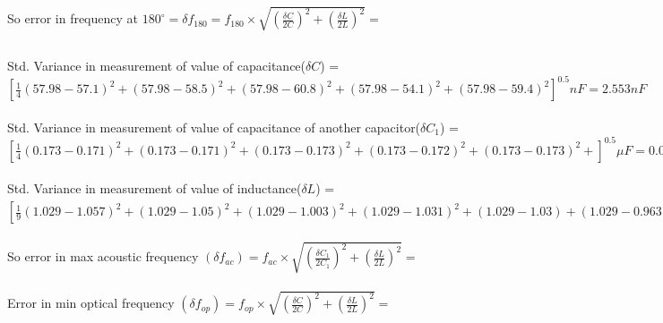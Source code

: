 So error in frequency at $180^{\circ} =\delta f_{180} =f_{180}\times \sqrt{\left( \frac{\delta C}{2C}\right)^2+\left(\frac{\delta L}{2L}\right)^2}=$
\subsection{\up{\d}}
Std. Variance in measurement of value of capacitance($\delta C$) = $[\frac{1}{4}(57.98-57.1)^2+(57.98-58.5)^2+ (57.98-60.8)^2+(57.98-54.1)^2+(57.98-59.4)^2]^{0.5}nF=2.553nF$\\ \\
Std. Variance in measurement of value of capacitance of another capacitor($\delta C_1$) = $[\frac{1}{4}(0.173-0.171)^2+(0.173-0.171)^2+(0.173-0.173)^2+ (0.173-0.172)^2+(0.173-0.173)^2+]^{0.5}\mu F=0.003\mu F$\\ \\
Std. Variance in measurement of value of inductance($\delta L$) = $[\frac{1}{9}(1.029-1.057)^2+(1.029-1.05)^2+(1.029-1.003)^2+(1.029-1.031)^2+(1.029-1.03)+(1.029-0.963)^2+(1.029-0.996)^2+(1.029-1.041)^2+(1.029-1.06)^2+(1.029-1.063)^2]^{0.5}mH=0.003mH$\\ \\
So error in max acoustic frequency  $(\delta f_{ac})=f_{ac}\times \sqrt{\left( \frac{\delta C_1}{2C_1}\right)^2+\left(\frac{\delta L}{2L}\right)^2}=$ \\ \\
Error in min optical frequency  $(\delta f_{op})=f_{op}\times \sqrt{\left( \frac{\delta C}{2C}\right)^2+\left(\frac{\delta L}{2L}\right)^2}=$ \\ \\
























